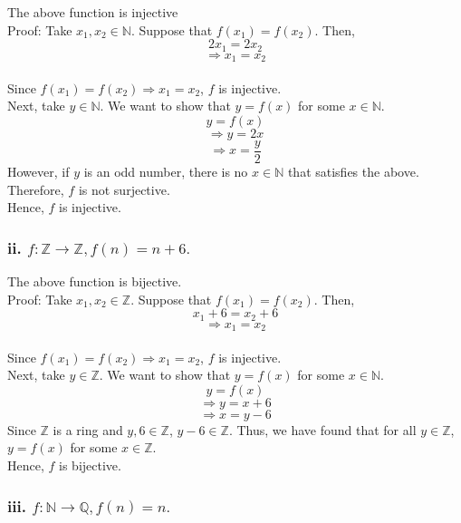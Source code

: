 \documentclass[
]{article}
\begin{document}
The above function is injective\\
Proof: Take \(x_1, x_2 \in \mathbb{N}\). Suppose that
\(f(x_1) = f(x_2)\). Then, \[2x_1 = 2x_2\]
\[ \Longrightarrow x_1 = x_2\]\\
Since \(f(x_1) = f(x_2)\Longrightarrow x_1 = x_2\), \(f\) is
injective.\\
Next, take \(y \in \mathbb{N}\). We want to show that \(y = f(x)\) for
some \(x \in \mathbb{N}\).\\
\[y = f(x)\] \[\Longrightarrow y = 2x\]
\[\Longrightarrow x = \frac{y}{2}\] However, if \(y\) is an odd number,
there is no \(x \in \mathbb{N}\) that satisfies the above. Therefore,
\(f\) is not surjective.\\
Hence, \(f\) is injective.

\hypertarget{ii.-fmathbbz-rightarrow-mathbbz-fn-n6.}{%
\subsubsection{\texorpdfstring{ii.
\(f:\mathbb{Z} \rightarrow \mathbb{Z}, f(n) = n+6.\)}{ii. f:\textbackslash mathbb\{Z\} \textbackslash rightarrow \textbackslash mathbb\{Z\}, f(n) = n+6.}}\label{ii.-fmathbbz-rightarrow-mathbbz-fn-n6.}}

The above function is bijective.\\
Proof: Take \(x_1, x_2 \in \mathbb{Z}\). Suppose that
\(f(x_1) = f(x_2)\). Then, \[x_1 + 6= x_2 + 6\]
\[ \Longrightarrow x_1 = x_2\]\\
Since \(f(x_1) = f(x_2)\Longrightarrow x_1 = x_2\), \(f\) is
injective.\\
Next, take \(y \in \mathbb{Z}\). We want to show that \(y = f(x)\) for
some \(x \in \mathbb{N}\).\\
\[y = f(x)\] \[\Longrightarrow y = x + 6\] \[\Longrightarrow x = y - 6\]
Since \(\mathbb{Z}\) is a ring and \(y, 6 \in \mathbb{Z}\),
\(y-6 \in \mathbb{Z}\). Thus, we have found that for all
\(y \in \mathbb{Z}\), \(y = f(x)\) for some \(x \in \mathbb{Z}\).\\
Hence, \(f\) is bijective.

\hypertarget{iii.-fmathbbn-rightarrow-mathbbq-fn-n.}{%
\subsubsection{\texorpdfstring{iii.
\(f:\mathbb{N} \rightarrow \mathbb{Q}, f(n) = n.\)}{iii. f:\textbackslash mathbb\{N\} \textbackslash rightarrow \textbackslash mathbb\{Q\}, f(n) = n.}}\label{iii.-fmathbbn-rightarrow-mathbbq-fn-n.}}
\end{document}
